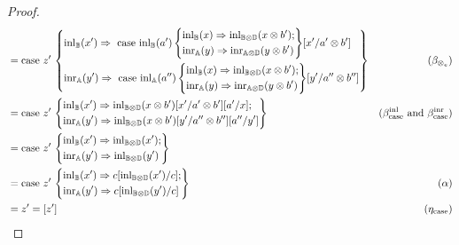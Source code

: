 \documentclass[a4paper,UKenglish,cleveref, autoref, thm-restate]{lipics-v2021}
\begin{document}
\begin{proof}
\begin{align*}
& =   \text{case } z' \,  
\left\{
  \begin{aligned} 
  &\mathrm{inl}_{\mathbb{B}}(x') \Rightarrow \text{ case } \mathrm{inl}_{\mathbb{B}}(a')\, \Bigg\{ 
    \begin{aligned}
    & \mathrm{inl}_{\mathbb{B}}(x) \Rightarrow \mathrm{inl}_{\mathbb{B} \otimes \mathbb{D}}(x \otimes b');\\
    & \mathrm{inr}_{\mathbb{A}}(y) \Rightarrow \mathrm{inr}_{\mathbb{A} \otimes \mathbb{D}} (y \otimes b')
    \end{aligned} \Bigg\} [x'/a' \otimes b'] \\
  &\mathrm{inr}_{\mathbb{A}}(y') \Rightarrow \text{ case } \mathrm{inl}_{\mathbb{A}}(a'')\, \Bigg\{ 
    \begin{aligned}
    & \mathrm{inl}_{\mathbb{B}}(x) \Rightarrow \mathrm{inl}_{\mathbb{B} \otimes \mathbb{D}}(x \otimes b');\\
    & \mathrm{inr}_{\mathbb{A}}(y) \Rightarrow \mathrm{inr}_{\mathbb{A} \otimes \mathbb{D}} (y \otimes b')
    \end{aligned} \Bigg\} [y'/a'' \otimes b'']  \\ 
\end{aligned}  
\right\}  &  (\beta_{\otimes_{e}}) \\
& =  \text{case } z' \,  
\left\{
  \begin{aligned} 
  &\mathrm{inl}_{\mathbb{B}}(x') \Rightarrow \mathrm{inl}_{\mathbb{B} \otimes \mathbb{D}}(x \otimes b') [x'/a' \otimes b'] [a'/x]; \\
  &\mathrm{inr}_{\mathbb{A}}(y') \Rightarrow  \mathrm{inl}_{\mathbb{B} \otimes \mathbb{D}}(x \otimes b') [y'/a'' \otimes b''] [a''/y']  
  \end{aligned}  
\right\}  &  (\beta_{\text{case}}^{\text{inl}} \text{ and } \beta_{\text{case}}^{\text{inr}}  )  \\
& =  \text{case } z' \,
\left\{
  \begin{aligned} 
  &\mathrm{inl}_{\mathbb{B}}(x') \Rightarrow \mathrm{inl}_{\mathbb{B} \otimes \mathbb{D}}(x'); \\
  &\mathrm{inr}_{\mathbb{A}}(y') \Rightarrow  \mathrm{inl}_{\mathbb{B} \otimes \mathbb{D}}(y') 
  \end{aligned}
\right\}  & \\
& =  \text{case } z' \,
\left\{
  \begin{aligned} 
  &\mathrm{inl}_{\mathbb{B}}(x') \Rightarrow c[\mathrm{inl}_{\mathbb{B} \otimes \mathbb{D}}(x')/c]; \\
  &\mathrm{inr}_{\mathbb{A}}(y') \Rightarrow  c[\mathrm{inl}_{\mathbb{B} \otimes \mathbb{D}}(y')/c] 
  \end{aligned}
\right\}  & (\alpha) \\
& =  z' = [z'] & (\eta_{\text{case}}) 
\end{align*}


\end{proof}
\end{document}
